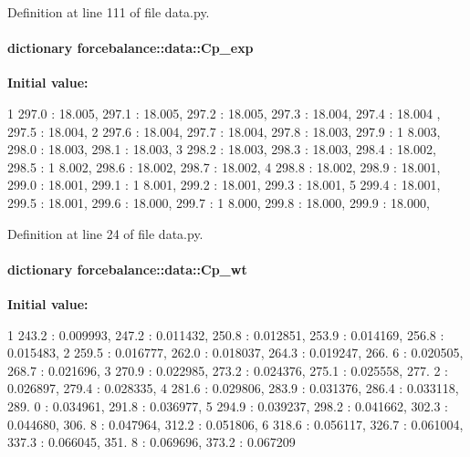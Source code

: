 \-Definition at line 111 of file data.\-py.

\hypertarget{namespaceforcebalance_1_1data_a05528f17d34352e3993ef0ffbc5f45f5}{
\paragraph[{\-Cp\-\_\-exp}]{\setlength{\rightskip}{0pt plus 5cm}dictionary {\bf forcebalance\-::data\-::\-Cp\-\_\-exp}}}\label{namespaceforcebalance_1_1data_a05528f17d34352e3993ef0ffbc5f45f5}
{\bfseries \-Initial value\-:}
\begin{DoxyCode}
1 {297.0 : 18.005, 297.1 : 18.005, 297.2 : 18.005, 297.3 : 18.004, 297.4 : 18.004
      , 297.5 : 18.004,
2                       297.6 : 18.004, 297.7 : 18.004, 297.8 : 18.003, 297.9 : 1
      8.003, 298.0 : 18.003, 298.1 : 18.003,
3                       298.2 : 18.003, 298.3 : 18.003, 298.4 : 18.002, 298.5 : 1
      8.002, 298.6 : 18.002, 298.7 : 18.002,
4                       298.8 : 18.002, 298.9 : 18.001, 299.0 : 18.001, 299.1 : 1
      8.001, 299.2 : 18.001, 299.3 : 18.001,
5                       299.4 : 18.001, 299.5 : 18.001, 299.6 : 18.000, 299.7 : 1
      8.000, 299.8 : 18.000, 299.9 : 18.000, }
\end{DoxyCode}


\-Definition at line 24 of file data.\-py.

\hypertarget{namespaceforcebalance_1_1data_aaf9b38b123578380133a90c041d25f8b}{
\paragraph[{\-Cp\-\_\-wt}]{\setlength{\rightskip}{0pt plus 5cm}dictionary {\bf forcebalance\-::data\-::\-Cp\-\_\-wt}}}\label{namespaceforcebalance_1_1data_aaf9b38b123578380133a90c041d25f8b}
{\bfseries \-Initial value\-:}
\begin{DoxyCode}
1 {243.2 : 0.009993, 247.2 : 0.011432, 250.8 : 0.012851, 253.9 : 0.014169, 256.8 
      : 0.015483, 
2                      259.5 : 0.016777, 262.0 : 0.018037, 264.3 : 0.019247, 266.
      6 : 0.020505, 268.7 : 0.021696, 
3                      270.9 : 0.022985, 273.2 : 0.024376, 275.1 : 0.025558, 277.
      2 : 0.026897, 279.4 : 0.028335, 
4                      281.6 : 0.029806, 283.9 : 0.031376, 286.4 : 0.033118, 289.
      0 : 0.034961, 291.8 : 0.036977, 
5                      294.9 : 0.039237, 298.2 : 0.041662, 302.3 : 0.044680, 306.
      8 : 0.047964, 312.2 : 0.051806, 
6                      318.6 : 0.056117, 326.7 : 0.061004, 337.3 : 0.066045, 351.
      8 : 0.069696, 373.2 : 0.067209}
\end{DoxyCode}


